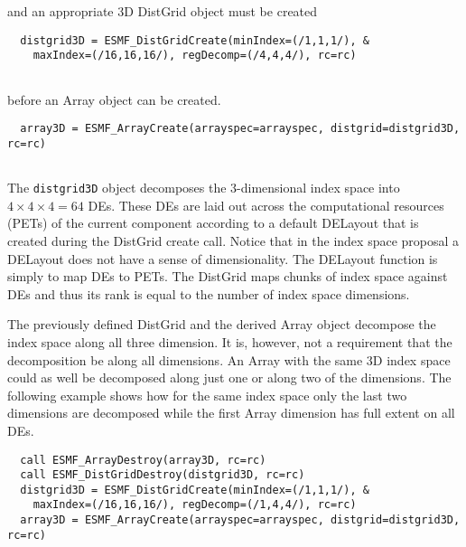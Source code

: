 
   and an appropriate 3D DistGrid object must be created 

 \begin{verbatim}
  distgrid3D = ESMF_DistGridCreate(minIndex=(/1,1,1/), &
    maxIndex=(/16,16,16/), regDecomp=(/4,4,4/), rc=rc)
 
\end{verbatim}
 

   before an Array object can be created. 

 \begin{verbatim}
  array3D = ESMF_ArrayCreate(arrayspec=arrayspec, distgrid=distgrid3D, rc=rc)
 
\end{verbatim}
 

   The {\tt distgrid3D} object decomposes the 3-dimensional index space into
   $4\times 4\times 4 = 64$ DEs. These DEs are laid out across the computational
   resources (PETs) of the current component according to a default DELayout that
   is created during the DistGrid create call. Notice that in the index space 
   proposal a DELayout does not have a sense of dimensionality. The DELayout
   function is simply to map DEs to PETs. The DistGrid maps chunks of index space
   against DEs and thus its rank is equal to the number of index space 
   dimensions.
  
   The previously defined DistGrid and the derived Array object decompose 
   the index space along all three dimension. It is, however, not a requirement
   that the decomposition be along all dimensions. An Array with the same 3D
   index space could as well be decomposed along just one or along two of the
   dimensions. The following example shows how for the same index space only the
   last two dimensions are decomposed while the first Array dimension has full
   extent on all DEs. 

 \begin{verbatim}
  call ESMF_ArrayDestroy(array3D, rc=rc)
  call ESMF_DistGridDestroy(distgrid3D, rc=rc)
  distgrid3D = ESMF_DistGridCreate(minIndex=(/1,1,1/), &
    maxIndex=(/16,16,16/), regDecomp=(/1,4,4/), rc=rc)
  array3D = ESMF_ArrayCreate(arrayspec=arrayspec, distgrid=distgrid3D, rc=rc)
 
\end{verbatim}
 
